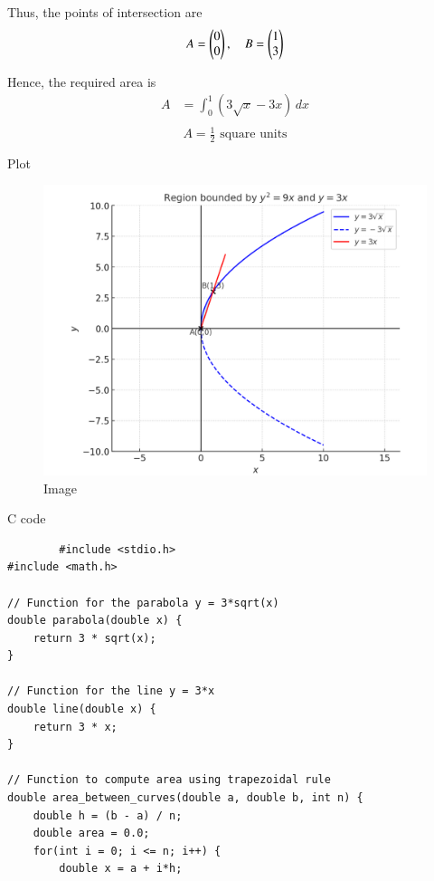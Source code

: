 \documentclass{beamer}
\begin{document}
 \begin{frame}
     
\noindent
Thus, the points of intersection are 
\[
A = \begin{pmatrix}0 \\ 0\end{pmatrix}, \quad B = \begin{pmatrix}1 \\ 3\end{pmatrix}
\] 
 
Hence, the required area is
\begin{align}
A &= \int_{0}^{1} (3\sqrt{x} - 3x)\,dx \\[2mm]
\end{align}
\[
\boxed{A = \tfrac{1}{2} \text{ square units}}
\]
 \end{frame}

\begin{frame}{Plot}
    \begin{figure}
    \centering
    \includegraphics[width=0.85\linewidth]{figs/image.png}
    \caption{Image}
    \label{fig:placeholder}
\end{figure}
\end{frame}

\begin{frame}[fragile]{C code}
    \begin{lstlisting}
        #include <stdio.h>
#include <math.h>

// Function for the parabola y = 3*sqrt(x)
double parabola(double x) {
    return 3 * sqrt(x);
}

// Function for the line y = 3*x
double line(double x) {
    return 3 * x;
}

// Function to compute area using trapezoidal rule
double area_between_curves(double a, double b, int n) {
    double h = (b - a) / n;
    double area = 0.0;
    for(int i = 0; i <= n; i++) {
        double x = a + i*h;
    \end{lstlisting}
\end{frame}
\end{document}
